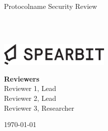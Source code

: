 \begin{titlepage}
  \vbox{}
  \vbox{}

  \begin{center}


    \noindent\makebox[\linewidth]{\rule{.7\paperwidth}{.6pt}}\\[0.7cm]

    { \huge \bfseries

      Protocolname Security Review
    }\\[0.25cm]
    
    \noindent\makebox[\linewidth]{\rule{.7\paperwidth}{.6pt}}\\[0.7cm]

    
    \vfill

    \includegraphics[width=0.40\textwidth]{img/spearbit_wordmark_black.png}

    
    \large
    {\bfseries Reviewers}\\
    
    Reviewer 1, Lead \\
    Reviewer 2, Lead \\
    Reviewer 3, Researcher

    {\large \today}

  \end{center}

\end{titlepage}